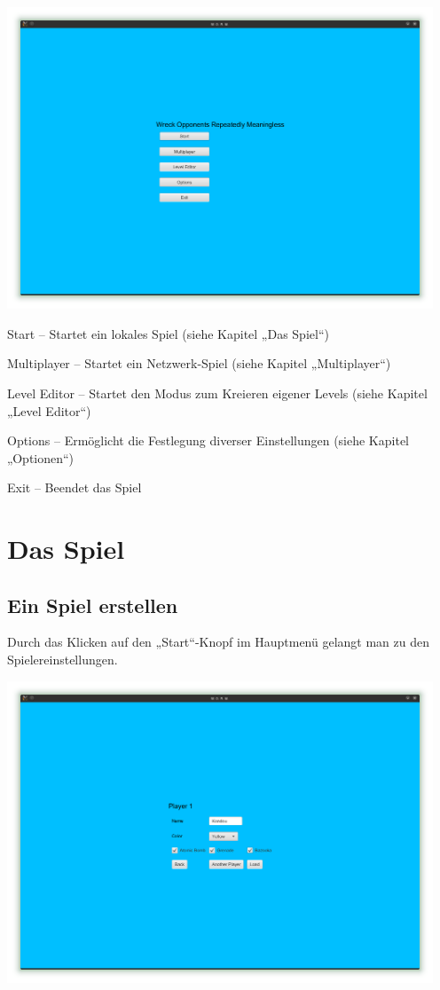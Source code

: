 \documentclass{scrreprt}
\begin{document}
\includegraphics[height=9cm]{Screenshot1.png}

Start – Startet ein lokales Spiel (siehe Kapitel „Das Spiel“)

Multiplayer – Startet ein Netzwerk-Spiel (siehe Kapitel „Multiplayer“)

Level Editor – Startet den Modus zum Kreieren eigener Levels (siehe Kapitel „Level Editor“)

Options – Ermöglicht die Festlegung diverser Einstellungen (siehe Kapitel „Optionen“)

Exit – Beendet das Spiel

\chapter{Das Spiel}

\section{Ein Spiel erstellen}

Durch das Klicken auf den „Start“-Knopf im Hauptmenü gelangt man zu den Spielereinstellungen.

\includegraphics[height=9cm]{Screenshot5.png}
\end{document}
